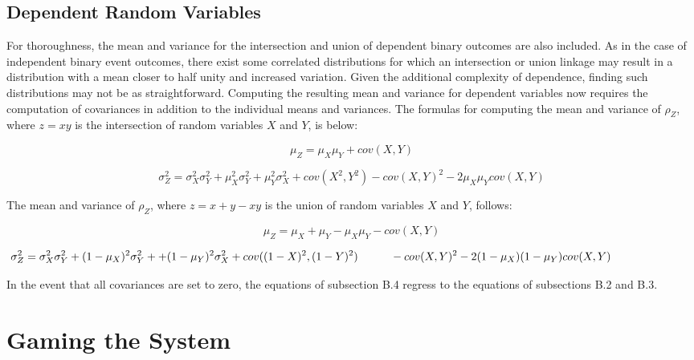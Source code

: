 \documentclass[sn-mathphys-num]{sn-jnl}
\theoremstyle{thmstyleone}%
\theoremstyle{thmstyletwo}%
\theoremstyle{thmstylethree}%
\begin{document}
\subsection{Dependent Random Variables}

For thoroughness, the mean and variance for the intersection and union of dependent binary outcomes are also included. As in the case of independent binary  event outcomes, there exist some correlated distributions for which an intersection or union linkage may result in a distribution with a mean closer to half unity and increased variation. Given the additional complexity of dependence, finding such distributions may not be as straightforward. Computing the resulting mean and variance for dependent variables now requires the computation of covariances in addition to the individual means and variances. The formulas for computing the mean and variance of $\rho_Z$, where $z = x y$ is the intersection of random variables $X$ and $Y$, is below:

\begin{equation}
\mu_Z = \mu_X \mu_Y + cov(X,Y)
\end{equation}

\begin{equation}
\sigma_Z^2 = \sigma_X^2 \sigma_Y^2 + \mu_X^2 \sigma_Y^2 + \mu_Y^2 \sigma_X^2 + cov(X^2,Y^2) - cov(X,Y)^2 - 2  \mu_X \mu_Y cov(X,Y)
\end{equation}
\vspace{.05in}

The mean and variance of $\rho_Z$, where  $z = x + y - x y$ is the union of random variables $X$ and $Y$, follows:

\begin{equation}
\mu_Z = \mu_X + \mu_Y - \mu_X \mu_Y - cov(X,Y)
\end{equation}

\begin{dmath}
\sigma_Z^2 = \sigma_X^2 \sigma_Y^2 + (1-\mu_X)^2 \sigma_Y^2 +
+ (1-\mu_Y)^2 \sigma_X^2 + cov((1-X)^2,(1-Y)^2) \hspace{.4in} - cov(X,Y)^2 - 2 (1-\mu_X)(1-\mu_Y) cov(X,Y) \hspace{1in}
\end{dmath}
\vspace{.05in}

In the event that all covariances are set to zero, the equations of subsection B.4 regress to the equations of subsections B.2 and B.3. 

\section{Gaming the System}
\end{document}
